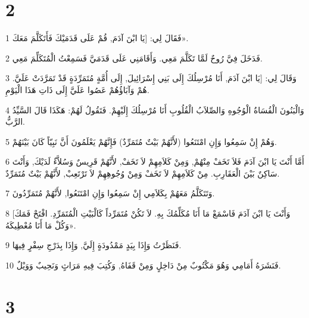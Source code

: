 \chapter{2}

\par 1 فَقَالَ لِي: [يَا ابْنَ آدَمَ, قُمْ عَلَى قَدَمَيْكَ فَأَتَكَلَّمَ مَعَكَ».
\par 2 فَدَخَلَ فِيَّ رُوحٌ لَمَّا تَكَلَّمَ مَعِي. وَأَقَامَنِي عَلَى قَدَمَيَّ فَسَمِعْتُ الْمُتَكَلِّمَ مَعِي.
\par 3 وَقَالَ لِي: [يَا ابْنَ آدَمَ, أَنَا مُرْسِلُكَ إِلَى بَنِي إِسْرَائِيلَ, إِلَى أُمَّةٍ مُتَمَرِّدَةٍ قَدْ تَمَرَّدَتْ عَلَيَّ. هُمْ وَآبَاؤُهُمْ عَصُوا عَلَيَّ إِلَى ذَاتِ هَذَا الْيَوْمِ.
\par 4 وَالْبَنُونَ الْقُسَاةُ الْوُجُوهِ وَالصِّلاَبُ الْقُلُوبِ أَنَا مُرْسِلُكَ إِلَيْهِمْ. فَتَقُولُ لَهُمْ: هَكَذَا قَالَ السَّيِّدُ الرَّبُّ.
\par 5 وَهُمْ إِنْ سَمِعُوا وَإِنِ امْتَنَعُوا (لأَنَّهُمْ بَيْتٌ مُتَمَرِّدٌ) فَإِنَّهُمْ يَعْلَمُونَ أَنَّ نَبِيّاً كَانَ بَيْنَهُمْ.
\par 6 أَمَّا أَنْتَ يَا ابْنَ آدَمَ فَلاَ تَخَفْ مِنْهُمْ, وَمِنْ كَلاَمِهِمْ لاَ تَخَفْ, لأَنَّهُمْ قَرِيسٌ وَسُلاَّءٌ لَدَيْكَ, وَأَنْتَ سَاكِنٌ بَيْنَ الْعَقَارِبِ. مِنْ كَلاَمِهِمْ لاَ تَخَفْ وَمِنْ وُجُوهِهِمْ لاَ تَرْتَعِبْ, لأَنَّهُمْ بَيْتٌ مُتَمَرِّدٌ.
\par 7 وَتَتَكَلَّمُ مَعَهُمْ بِكَلاَمِي إِنْ سَمِعُوا وَإِنِ امْتَنَعُوا, لأَنَّهُمْ مُتَمَرِّدُونَ.
\par 8 [وَأَنْتَ يَا ابْنَ آدَمَ فَاسْمَعْ مَا أَنَا مُكَلِّمُكَ بِهِ. لاَ تَكُنْ مُتَمَرِّداً كَالْبَيْتِ الْمُتَمَرِّدِ. افْتَحْ فَمَكَ وَكُلْ مَا أَنَا مُعْطِيكَهُ».
\par 9 فَنَظَرْتُ وَإِذَا بِيَدٍ مَمْدُودَةٍ إِلَيَّ, وَإِذَا بِدَرْجِ سِفْرٍ فِيهَا.
\par 10 فَنَشَرَهُ أَمَامِي وَهُوَ مَكْتُوبٌ مِنْ دَاخِلٍ وَمِنْ قَفَاهُ, وَكُتِبَ فِيهِ مَرَاثٍ وَنَحِيبٌ وَوَيْلٌ.

\chapter{3}

